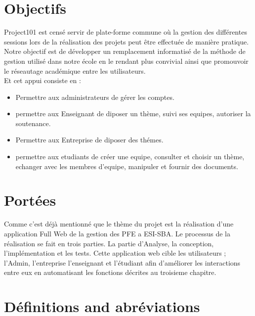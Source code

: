 \documentclass[11pt,fleqn]{book} %
\begin{document}
\section{Objectifs}
Project101 est censé servir de plate-forme commune où la gestion des différentes sessions lors de la réalisation des projets peut être effectuée de manière pratique. Notre objectif est de développer un remplacement informatisé de la méthode de gestion utilisé dans notre école en le rendant plus convivial ainsi que promouvoir le réseautage académique entre les utilisateurs. \\
Et cet appui consiste en :
\begin{itemize}
    \item Permettre aux administrateurs de gérer les comptes.
    \item permettre aux Enseignant de diposer un thème, suivi ses equipes, autoriser la soutenance.
    \item Permettre aux Entreprise de diposer des thémes.
      \item permettre aux etudiants de créer une equipe, consulter et choisir un thème, echanger avec les membres d'equipe, manipuler et fournir des documents.
\end{itemize}

\section{Portées}
Comme c’est déjà mentionné que le thème du projet est la réalisation 
d’une application Full Web de la gestion des PFE a ESI-SBA. Le 
processus de la réalisation se fait en trois parties. La partie d’Analyse, 
la conception, l’implémentation et les tests. Cette 
application web cible les utilisateurs ; l’Admin, l'entreprise l’enseignant et l’étudiant afin d’améliorer les interactions entre eux en automatisant 
les fonctions décrites au troisieme chapitre.

\section{Définitions and abréviations}
\end{document}
